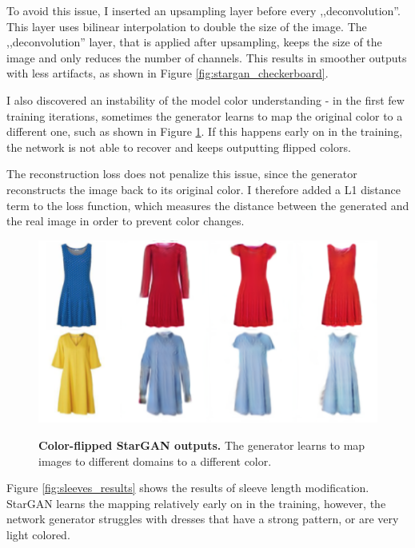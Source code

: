 \documentclass[12pt]{report}
\begin{document}
To avoid this issue, I inserted an upsampling layer before every ,,deconvolution''. This layer uses bilinear interpolation to double the size of the image. The ,,deconvolution'' layer, that is applied after upsampling, keeps the size of the image and only reduces the number of channels. This results in smoother outputs with less artifacts, as shown in Figure \ref{fig:stargan_checkerboard}.

I also discovered an instability of the model color understanding - in the first few training iterations, sometimes the generator learns to map the original color to a different one, such as shown in Figure \ref{fig:stargan_color}. If this happens early on in the training, the network is not able to recover and keeps outputting flipped colors.

The reconstruction loss does not penalize this issue, since the generator reconstructs the image back to its original color. I therefore added a L1 distance term to the loss function, which measures the distance between the generated and the real image in order to prevent color changes.

\begin{figure}[h]
\centering
{\includegraphics[width=.7\linewidth]{04_experiments/stargan/color_flip}}
\caption{\label{fig:stargan_color} \textbf{Color-flipped StarGAN outputs.} The generator learns to map images to different domains to a different color.}
\end{figure}

\pagebreak
Figure \ref{fig:sleeves_results} shows the results of sleeve length modification. StarGAN learns the mapping relatively early on in the training, however, the network generator struggles with dresses that have a strong pattern, or are very light colored.
\end{document}
